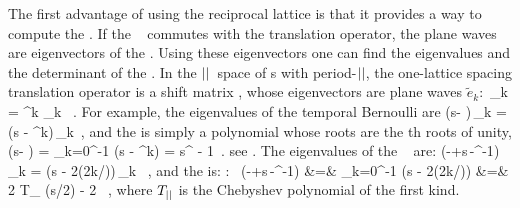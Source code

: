 The first advantage of using the reciprocal lattice is that it provides a
way to compute the {\HillDet}.
If the \jacobianOrb\  commutes with the translation
operator, the plane waves are eigenvectors of the \jacobianOrb. Using
these eigenvectors one can find the eigenvalues and the determinant of
the \jacobianOrb. In the ${||}$\dmn\ space of {\lattstate}s with
period-${||}$, the one-lattice spacing translation operator is a shift
matrix ,
whose eigenvectors are plane waves $\tilde{e}_k$:
\bea
\shift\,_k = \omega^{k} _k \, .
\eea
For example, the eigenvalues of the {temporal Bernoulli}
{\jacobianOrb}  are
\bea
({s}\id - {\shift})\,_k
= ({s} - \omega^{k})\,_k
\,,
\eea
and the {\HillDet} is simply a polynomial whose roots are the \cl{}th
roots of unity,
\bea
\Det({s}\id - {\shift})
=
\prod_{k=0}^{\cl{}-1} ({s} - \omega^{k})
=
s^{\cl{}} - 1
\,.
\eea
see .
The eigenvalues of the \templatt\
{\jacobianOrb}  are:
\bea
(-\shift+{s}\,\id-\shift^{-1})\,_k
=
({s} - 2\cos(2\pi k/\cl{}))\,_k \, ,
\eea
and the {\HillDet} is:
\bea
\mbox{\templatt: }\quad
\Det(-\shift+{s}\,\id-\shift^{-1})
    &=&
\prod_{k=0}^{\cl{}-1} ({s} - 2\cos(2\pi k/\cl{}))
    \continue
    &=&
2 T_{\cl{}} \left({s}/{2}\right) - 2 \, ,
\eea
where $T_{{||}}$ is the Chebyshev polynomial of the first
kind.

